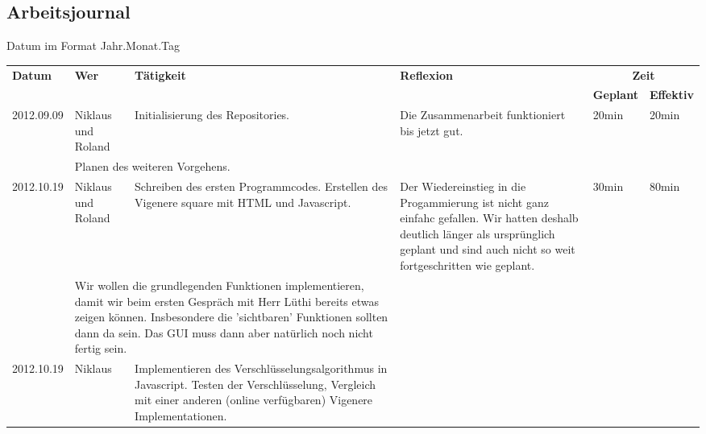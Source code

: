 \documentclass[11pt,paper=a4,final]{scrartcl}
\begin{document}
\begin{landscape}
  \section{Arbeitsjournal}
  Datum im Format Jahr.Monat.Tag
  \begin{longtable}{|p{1.8cm}|p{1.5cm}|p{5.0cm}|p{11.0cm}|l|l|}
    \hline
    \multirow{2}{*}{\bf Datum} & \multirow{2}{*}{\bf Wer} &\multirow{2}{*}{\bf T\"atigkeit} & \multirow{2}{*}{\bf Reflexion} & \multicolumn{2}{c|}{\bf Zeit} \\ \cline{5-6}
     & & & & \bf Geplant & \bf Effektiv \\ \hline
    \hline
    \endhead
    2012.09.09 & Niklaus und Roland &
    Initialisierung des Repositories. &
    Die Zusammenarbeit funktioniert bis jetzt gut. &
    20min & 20min \\ \hline \nopagebreak
    \multicolumn{2}{|l|}{\bf Pendenzen} &\multicolumn{2}{p{16.0cm}|}{Planen des weiteren Vorgehens.}  & \multicolumn{2}{l|}{} \\ \hline
    \hline
    2012.10.19 & Niklaus und Roland &
    Schreiben des ersten Programmcodes. Erstellen des Vigenere square mit HTML und Javascript. &
    Der Wiedereinstieg in die Progammierung ist nicht ganz einfahc gefallen. Wir hatten deshalb deutlich l\"anger als urspr\"unglich geplant und sind auch nicht so weit fortgeschritten wie geplant. &
    30min & 80min \\ \hline \nopagebreak
    \multicolumn{2}{|l|}{\bf Pendenzen} &\multicolumn{2}{p{16.0cm}|}{Wir wollen die grundlegenden Funktionen implementieren, damit wir beim ersten Gespr\"ach mit Herr L\"uthi bereits etwas zeigen k\"onnen. Insbesondere die 'sichtbaren' Funktionen sollten dann da sein. Das GUI muss dann aber nat\"urlich noch nicht fertig sein.}  & \multicolumn{2}{l|}{} \\ \hline
    \hline
    2012.10.19 & Niklaus &
    Implementieren des Verschl\"usselungsalgorithmus in Javascript. Testen der Verschl\"usselung, Vergleich mit einer anderen (online verf\"ugbaren) Vigenere Implementationen.&

\end{longtable}
\end{landscape}
\end{document}

